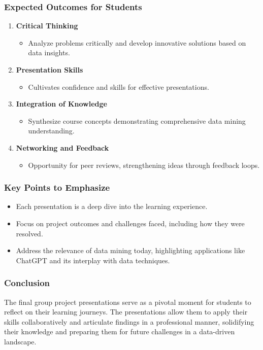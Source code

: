 \documentclass[aspectratio=169]{beamer}
\begin{document}
\begin{frame}[fragile]
    \frametitle{Expected Outcomes for Students}
    \begin{enumerate}
        \item \textbf{Critical Thinking}
        \begin{itemize}
            \item Analyze problems critically and develop innovative solutions based on data insights.
        \end{itemize}

        \item \textbf{Presentation Skills}
        \begin{itemize}
            \item Cultivates confidence and skills for effective presentations.
        \end{itemize}

        \item \textbf{Integration of Knowledge}
        \begin{itemize}
            \item Synthesize course concepts demonstrating comprehensive data mining understanding.
        \end{itemize}

        \item \textbf{Networking and Feedback}
        \begin{itemize}
            \item Opportunity for peer reviews, strengthening ideas through feedback loops.
        \end{itemize}
    \end{enumerate}
\end{frame}

\begin{frame}[fragile]
    \frametitle{Key Points to Emphasize}
    \begin{itemize}
        \item Each presentation is a deep dive into the learning experience.
        \item Focus on project outcomes and challenges faced, including how they were resolved.
        \item Address the relevance of data mining today, highlighting applications like ChatGPT and its interplay with data techniques.
    \end{itemize}
\end{frame}

\begin{frame}[fragile]
    \frametitle{Conclusion}
    \begin{block}{}
        The final group project presentations serve as a pivotal moment for students to reflect on their learning journeys. The presentations allow them to apply their skills collaboratively and articulate findings in a professional manner, solidifying their knowledge and preparing them for future challenges in a data-driven landscape.
    \end{block}
\end{frame}
\end{document}
